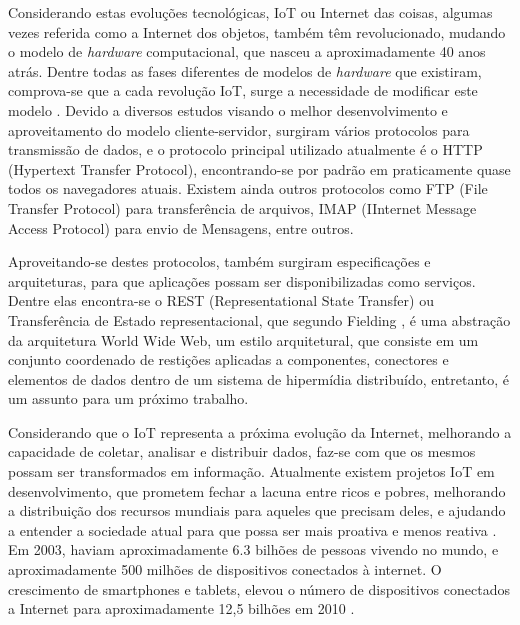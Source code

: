 \documentclass[journal]{IEEEtran}
\begin{document}
Considerando estas evoluções tecnológicas, IoT ou Internet das coisas, algumas vezes referida como a Internet dos objetos, também têm revolucionado, mudando o modelo de \emph{hardware} computacional, que nasceu a aproximadamente 40 anos atrás. Dentre todas as fases diferentes de modelos de \emph{hardware} que existiram, comprova-se que a cada revolução IoT, surge a necessidade de modificar este modelo \cite[p.~6]{dzonevoltreeiot}. Devido a diversos estudos visando o melhor desenvolvimento e aproveitamento do modelo cliente-servidor, surgiram vários protocolos para transmissão de dados, e o protocolo principal utilizado atualmente é o HTTP (Hypertext Transfer Protocol), encontrando-se por padrão em praticamente quase todos os navegadores atuais. Existem ainda outros protocolos como FTP (File Transfer Protocol) para transferência de arquivos, IMAP (IInternet Message Access Protocol) para envio de Mensagens, entre outros. 

Aproveitando-se destes protocolos, também surgiram especificações e arquiteturas, para que aplicações possam ser disponibilizadas como serviços. Dentre elas encontra-se o REST (Representational State Transfer) ou Transferência de Estado representacional, que segundo Fielding \cite{roythomasfielding2017}, é uma abstração da arquitetura World Wide Web, um estilo  arquitetural, que consiste em um conjunto coordenado de restições aplicadas a componentes, conectores e elementos de dados dentro de um sistema de hipermídia distribuído, entretanto, é um assunto para um próximo trabalho.

Considerando que o IoT representa a próxima evolução da Internet, melhorando a capacidade de coletar, analisar e distribuir dados, faz-se com que os mesmos possam ser transformados em informação. Atualmente existem projetos IoT em desenvolvimento, que prometem fechar a lacuna entre ricos e pobres, melhorando a distribuição dos recursos mundiais para aqueles que precisam deles, e ajudando a entender a sociedade atual para que possa ser mais proativa e menos reativa \cite[p.~2]{Evans}. Em 2003, haviam aproximadamente 6.3 bilhões de pessoas vivendo no mundo, e aproximadamente 500 milhões de dispositivos conectados à internet. O crescimento de smartphones e tablets, elevou o número de dispositivos conectados a Internet para aproximadamente 12,5 bilhões em 2010 \cite[p.~3]{Evans}.
\end{document}
